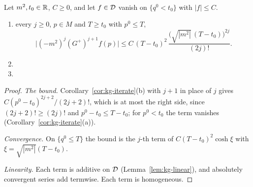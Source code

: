 \begin{proposition}[Convergence]\label{prop:kg-conv}
Let $m^2,t_0\in\mathbb R$, $C\ge0$, and let $f\in\mathcal D$ vanish on $\{q^0<t_0\}$ with $|f|\le C$. 
\begin{enumerate}[label=(\alph*),leftmargin=2.5em]
\item {} every $j\ge0$, $p\in M$ and $T\ge t_0$ with $p^0\le T$,
\[
\bigl|(-m^2)^j(G^+)^{j+1}f(p)\bigr|\le C\,(T-t_0)^2\,\frac{\bigl(\sqrt{|m^2|}\,(T-t_0)\bigr)^{2j}}{(2j)!}.
\]
\item {}
\item {}
\end{enumerate}
\end{proposition}
\begin{proof}
\emph{The bound.} Corollary~\ref{cor:kg-iterate}(b) with $j+1$ in place of $j$ gives
$C(p^0-t_0)^{2j+2}/(2j+2)!$, which is at most the right side, since $(2j+2)!\ge(2j)!$ and
$p^0-t_0\le T-t_0$; for $p^0<t_0$ the term vanishes (Corollary~\ref{cor:kg-iterate}(a)).

\emph{Convergence.} On $\{q^0\le T\}$ the bound is the $j$-th term of $C(T-t_0)^2\cosh\xi$ with
$\xi=\sqrt{|m^2|}(T-t_0)$.

\emph{Linearity.} Each term is additive on $\mathcal D$ (Lemma~\ref{lem:kg-linear}), and absolutely
convergent series add termwise. Each term is homogeneous.
\end{proof}

